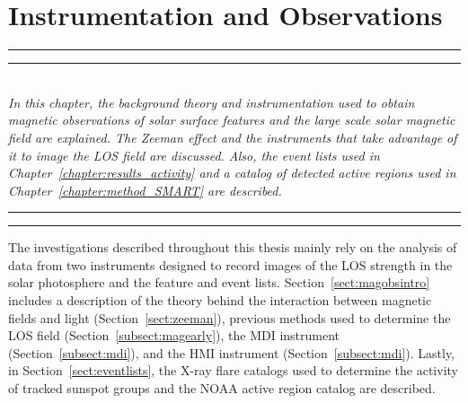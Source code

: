 
\chapter{Instrumentation and Observations} %
\label{chapter:data}

\graphicspath{{3/figures/}}

\glsresetall

\hrule height 1mm
\vspace{0.5mm}
\hrule height 0.4mm 
\noindent 
\\ {\it 
In this chapter, the background theory and instrumentation used to obtain magnetic observations of solar surface features and the large scale solar magnetic field are explained. The Zeeman effect and the instruments that take advantage of it to image the LOS field are discussed. Also, the event lists used %
in Chapter~\ref{chapter:results_activity} and a catalog of detected active regions used %
in Chapter~\ref{chapter:method_SMART} are described. 
}
\\ 
\hrule height 0.4mm
\vspace{0.5mm}
\hrule height 1mm 
\vspace{1.5cm}

The investigations described throughout this thesis mainly rely on the analysis of data from two instruments designed to record images of the \gls{LOS} strength in the solar photosphere and the feature and event lists. Section~\ref{sect:magobsintro} includes a description of the theory behind the interaction between magnetic fields and light (Section~\ref{sect:zeeman}), previous methods used to determine the \gls{LOS} field (Section~\ref{subsect:magearly}), the \gls{MDI} instrument (Section~\ref{subsect:mdi}), and the \gls{HMI} instrument (Section~\ref{subsect:mdi}). Lastly, in Section~\ref{sect:eventlists}, the X-ray flare catalogs used to determine the activity of tracked sunspot groups and the NOAA active region catalog are described. 

